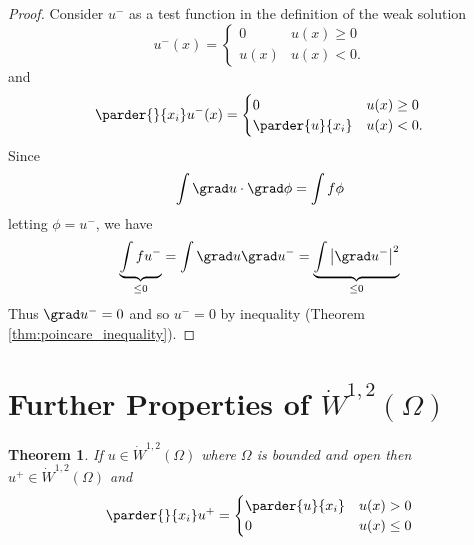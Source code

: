 \documentclass[10pt, oneside, reqno]{amsart}
\theoremstyle{plain}%
\newtheorem{thm}{Theorem}[section]
\numberwithin{equation}{section}
\theoremstyle{definition}
\theoremstyle{remark}
\begin{document}
\begin{proof}
    Consider $u^-$ as a test function in the definition of the weak solution \[
        u^-(x) = \begin{cases}
            0       & u(x) \geq 0 \\
            u(x)    & u(x) < 0.
        \end{cases}
    \] and \[
     \parder{}{x_i}u^-(x) = \begin{cases}
            0               & u(x) \geq 0 \\
            \parder{u}{x_i} & u(x) < 0.
        \end{cases}
    \]  Since \[
        \int \grad u  \cdot \grad \phi = \int f \phi
    \] letting $\phi = u^-$, we have \[
    \underbrace{\int f u^{-}}_{\leq 0} = \int \grad u \grad u^- = \underbrace{\int \left| \grad u^- \right|^2 }_{\leq 0}
    \]  Thus $\grad u^- = 0$ and so $u^- = 0$ by \poincare inequality (Theorem \ref{thm:poincare_inequality}).
\end{proof}


\section{Further Properties of $\dot W^{1,2}(\Omega)$} %
\label{sec:further_properties_of_dot_w_1_2_omega_}
\begin{thm}
    \label{thm:his_thm_7.1}
    If $u \in \dot W^{1, 2}(\Omega)$ where $\Omega$ is bounded and open then $u^+ \in \dot W^{1, 2}(\Omega)$ and \[
        \parder{}{x_i} u^+ = \begin{cases}
            \parder{u}{x_i} & u(x) > 0 \\
            0 & u(x) \leq 0
        \end{cases}
    \]  
\end{thm}
\end{document}
